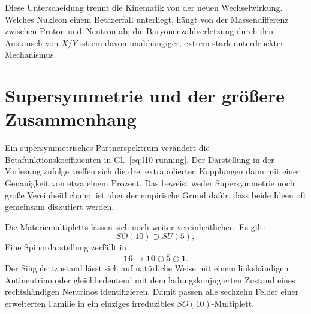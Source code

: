 \begin{classroomqa}
\end{classroomqa}

Diese Unterscheidung trennt die Kinematik von der neuen Wechselwirkung. Welches Nukleon einem Betazerfall unterliegt, hängt von der Massendifferenz zwischen Proton und--Neutron ab; die Baryonenzahlverletzung durch den Austausch von \(X/Y\) ist ein davon unabhängiger, extrem stark unterdrückter Mechanismus.

\section{Supersymmetrie und der größere Zusammenhang}

Ein supersymmetrisches Partnerspektrum verändert die Betafunktionskoeffizienten in Gl.~\eqref{eq:l10-running}. Der Darstellung in der Vorlesung zufolge treffen sich die drei extrapolierten Kopplungen dann mit einer Genauigkeit von etwa einem Prozent. Das beweist weder Supersymmetrie noch große Vereinheitlichung, ist aber der empirische Grund dafür, dass beide Ideen oft gemeinsam diskutiert werden.

Die Materiemultipletts lassen sich noch weiter vereinheitlichen. Es gilt:
\begin{equation}
SO(10)\supset SU(5),
\end{equation}
Eine Spinordarstellung zerfällt in
\begin{equation}
\mathbf{16}
\longrightarrow
\mathbf{10}\oplus\overline{\mathbf5}\oplus\mathbf1.
\label{eq:l10-so10}
\end{equation}
Der Singulettzustand lässt sich auf natürliche Weise mit einem linkshändigen Antineutrino oder gleichbedeutend mit dem ladungskonjugierten Zustand eines rechtshändigen Neutrinos identifizieren. Damit passen alle sechzehn Felder einer erweiterten Familie in ein einziges irreduzibles \(SO(10)\)-Multiplett.


